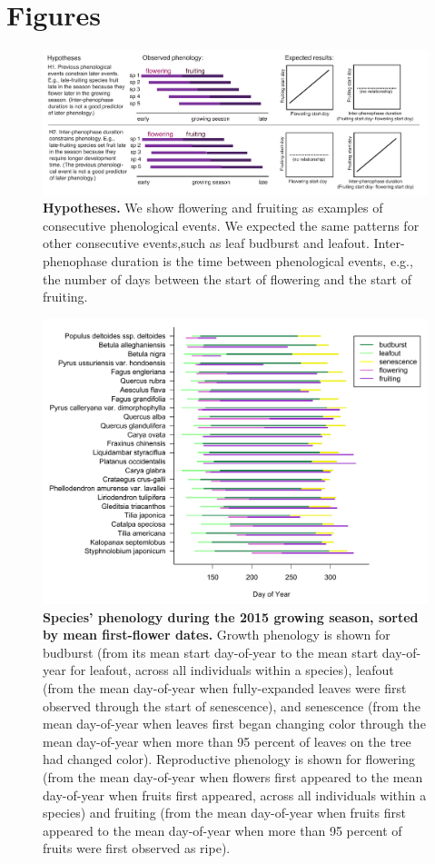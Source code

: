 \documentclass{article}
\begin{document}
\section* {Figures}
\begin{figure}[p]
  \centering
  \includegraphics{../analyses/figures/hypotheses3.pdf} 
  \caption{\textbf{Hypotheses.} We show flowering and fruiting as examples of consecutive phenological events. We expected the same patterns for other consecutive events,such as leaf budburst and leafout. Inter-phenophase duration is the time between phenological events, e.g., the number of days between the start of flowering and the start of fruiting.} 
 \label{fig:hyp}
\end{figure}
 
\begin{figure}[h]
  \centering
  \includegraphics{../analyses/figures/grosea_repsort_legend.pdf}
  \caption{\textbf{Species' phenology during the 2015 growing season, sorted by mean first-flower dates.} Growth phenology is shown for budburst (from its mean start day-of-year to the mean start day-of-year for leafout, across all individuals within a species), leafout (from the mean day-of-year when fully-expanded leaves were first observed through the start of senescence), and senescence (from the mean day-of-year when leaves first began changing color through the mean day-of-year when more than 95 percent of leaves on the tree had changed color). Reproductive phenology is shown for flowering (from the mean day-of-year when flowers first appeared to the mean day-of-year when fruits first appeared, across all individuals within a species) and fruiting (from the mean day-of-year when fruits first appeared to the mean day-of-year when more than 95 percent of fruits were first observed as ripe).}
  \label{fig:focsp}
\end{figure}
  
\end{document}

